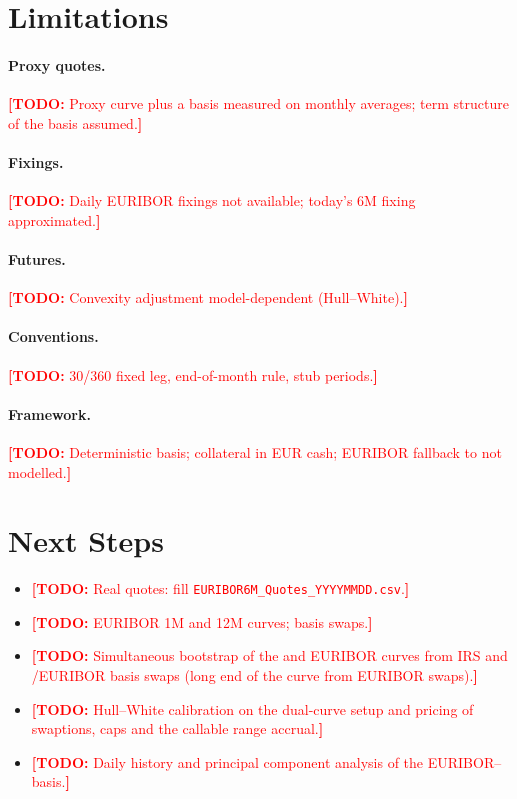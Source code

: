 \documentclass[11pt,a4paper]{article}
\theoremstyle{plain}
\theoremstyle{definition}
\newcommand{\estr}{\text{\texteuro STR}}
\newcommand{\todo}[1]{\textcolor{red}{\textbf{[TODO:} #1\textbf{]}}}
\begin{document}
\clearpage
\section{Limitations}
\label{sec:limits}

\paragraph{Proxy quotes.} \todo{Proxy \estr{} curve plus a basis measured on monthly averages; term structure of the basis assumed.}

\paragraph{Fixings.} \todo{Daily EURIBOR fixings not available; today's 6M fixing approximated.}

\paragraph{Futures.} \todo{Convexity adjustment model-dependent (Hull--White).}

\paragraph{Conventions.} \todo{30/360 fixed leg, end-of-month rule, stub periods.}

\paragraph{Framework.} \todo{Deterministic basis; collateral in EUR cash; EURIBOR fallback to \estr{} not modelled.}

\section{Next Steps}
\label{sec:next-steps}

\begin{itemize}
    \item \todo{Real quotes: fill \texttt{EURIBOR6M\_Quotes\_YYYYMMDD.csv}.}
    \item \todo{EURIBOR 1M and 12M curves; basis swaps.}
    \item \todo{Simultaneous bootstrap of the \estr{} and EURIBOR curves from IRS and \estr{}/EURIBOR basis swaps (long end of the \estr{} curve from EURIBOR swaps).}
    \item \todo{Hull--White calibration on the dual-curve setup and pricing of swaptions, caps and the callable range accrual.}
    \item \todo{Daily history and principal component analysis of the EURIBOR--\estr{} basis.}
\end{itemize}
\end{document}
